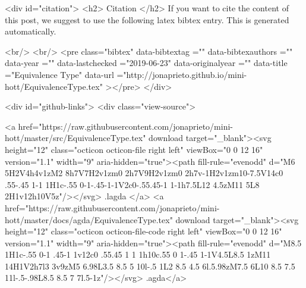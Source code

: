   
  <div id="citation">
  <h2> Citation </h2>
  If you want to cite the content of this post,
  we suggest to use the following latex bibtex entry.
  This is generated automatically.

  <br/>
  <br/>
  <pre class="bibtex"
       data-bibtextag =""
       data-bibtexauthors =""
       data-year =""
       data-lastchecked ="2019-06-23"
       data-originalyear =""
       data-title ="Equivalence Type"
       data-url ="http://jonaprieto.github.io/mini-hott/EquivalenceType.tex"
  ></pre>
  </div>
  

  <div id="github-links">
    <div class="view-source">
      
        <a href="https://raw.githubusercontent.com/jonaprieto/mini-hott/master/src/EquivalenceType.tex" download target="_blank"><svg height="12" class="octicon octicon-file right left" viewBox="0 0 12 16" version="1.1" width="9" aria-hidden="true"><path fill-rule="evenodd" d="M6 5H2V4h4v1zM2 8h7V7H2v1zm0 2h7V9H2v1zm0 2h7v-1H2v1zm10-7.5V14c0 .55-.45 1-1 1H1c-.55 0-1-.45-1-1V2c0-.55.45-1 1-1h7.5L12 4.5zM11 5L8 2H1v12h10V5z"/></svg> .lagda </a>
        <a href="https://raw.githubusercontent.com/jonaprieto/mini-hott/master/docs/agda/EquivalenceType.tex" download target="_blank"><svg height="12" class="octicon octicon-file-code right left" viewBox="0 0 12 16" version="1.1" width="9" aria-hidden="true"><path fill-rule="evenodd" d="M8.5 1H1c-.55 0-1 .45-1 1v12c0 .55.45 1 1 1h10c.55 0 1-.45 1-1V4.5L8.5 1zM11 14H1V2h7l3 3v9zM5 6.98L3.5 8.5 5 10l-.5 1L2 8.5 4.5 6l.5.98zM7.5 6L10 8.5 7.5 11l-.5-.98L8.5 8.5 7 7l.5-1z"/></svg> .agda</a>
      
